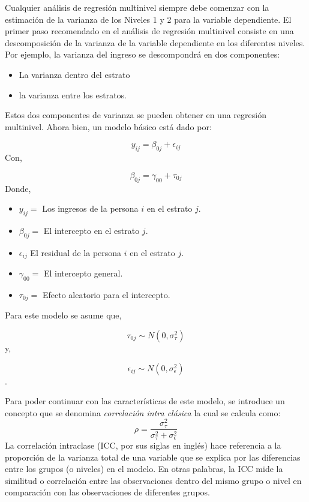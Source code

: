 \documentclass[
  12pt,
]{book}
\providecommand{\tightlist}{%
  \setlength{\itemsep}{0pt}\setlength{\parskip}{0pt}}
\begin{document}
Cualquier análisis de regresión multinivel siempre debe comenzar con la estimación de la varianza de los Niveles 1 y 2 para la variable dependiente. El primer paso recomendado en el análisis de regresión multinivel consiste en una descomposición de la varianza de la variable dependiente en los diferentes niveles. Por ejemplo, la varianza del ingreso se descompondrá en dos componentes:

\begin{itemize}
\tightlist
\item
  La varianza dentro del estrato
\item
  la varianza entre los estratos.
\end{itemize}

Estos dos componentes de varianza se pueden obtener en una regresión multinivel. Ahora bien, un modelo básico está dado por:

\[
y_{ij}=\beta_{0j}+\epsilon_{ij}
\]
Con,

\[
\beta_{0j}=\gamma_{00}+\tau_{0j}
\]
Donde,

\begin{itemize}
\tightlist
\item
  \(y_{ij}=\) Los ingresos de la persona \(i\) en el estrato \(j\).
\item
  \(\beta_{0j}=\) El intercepto en el estrato \(j\).
\item
  \(\epsilon_{ij}\) El residual de la persona \(i\) en el estrato \(j\).
\item
  \(\gamma_{00}=\) El intercepto general.
\item
  \(\tau_{0j}=\) Efecto aleatorio para el intercepto.
\end{itemize}

Para este modelo se asume que,

\[
\tau_{0j}\sim N\left(0,\sigma_{\tau}^{2}\right)
\]
y,

\[
\epsilon_{ij}\sim N\left(0,\sigma_{\epsilon}^{2}\right)
\].

Para poder continuar con las características de este modelo, se introduce un concepto que se denomina \emph{correlación intra clásica} la cual se calcula como:
\[
\rho=\frac{\sigma_{\tau}^{2}}{\sigma_{\tau}^{2}+\sigma_{\epsilon}^{2}}
\]
La correlación intraclase (ICC, por sus siglas en inglés) hace referencia a la proporción de la varianza total de una variable que se explica por las diferencias entre los grupos (o niveles) en el modelo. En otras palabras, la ICC mide la similitud o correlación entre las observaciones dentro del mismo grupo o nivel en comparación con las observaciones de diferentes grupos.
\end{document}
